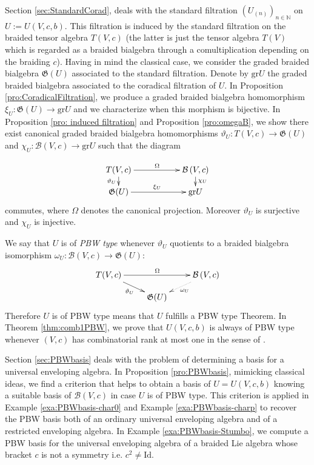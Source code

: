 \documentclass[english]{amsart}
\numberwithin{equation}{section}
\numberwithin{figure}{section}
\theoremstyle{plain}
\theoremstyle{definition}
\theoremstyle{definition}
\theoremstyle{remark}
\theoremstyle{remark}
\theoremstyle{plain}
\theoremstyle{plain}
\theoremstyle{plain}
\begin{document}
Section \ref{sec:StandardCorad}, deals with the standard filtration
$(U_{(n)})_{n\in\mathbb{N}}$ on $U:=U(V,c,b)$. This filtration is
induced by the standard filtration on the braided tensor algebra $T(V,c)$
(the latter is just the tensor algebra $T(V)$ which is regarded as
a braided bialgebra through a comultiplication depending on the braiding
$c$). Having in mind the classical case, we consider the graded braided
bialgebra $\mathfrak{G}(U)$ associated to the standard filtration.
Denote by $\mathrm{gr}U$ the graded braided bialgebra associated
to the coradical filtration of $U$. In Proposition \ref{pro:CoradicalFiltration},
we produce a graded braided bialgebra homomorphism $\xi_{U}:\mathfrak{G}\left(U\right)\rightarrow\mathrm{gr}U$
and we characterize when this morphism is bijective. In Proposition
\ref{pro: induced filtration} and Proposition \ref{pro:omegaB},
we show there exist canonical graded braided bialgebra homomorphisms
$\vartheta_{U}:T\left(V,c\right)\rightarrow\mathfrak{G}\left(U\right)$
and $\chi_{U}:\mathcal{B}\left(V,c\right)\rightarrow\mathrm{gr}U$
such that the diagram

\begin{equation}
\xymatrix@R=10pt{T(V,c)\ar[rr]^{\Omega}\ar[d]_{\vartheta_{U}} &  & \mathcal{B}\left(V,c\right)\ar[d]^{\chi_{U}}\\
\mathfrak{G}(U)\ar[rr]^{\xi_{U}} &  & \mathrm{gr}U}
\label{diag:chi}\end{equation}
commutes, where $\Omega$ denotes the canonical projection. Moreover
$\vartheta_{U}$ is surjective and $\chi_{U}$ is injective. 

We say that $U$ is of \emph{PBW type} whenever $\vartheta_{U}$ quotients
to a braided bialgebra isomorphism $\omega_{U}:\mathcal{B}\left(V,c\right)\rightarrow\mathfrak{G}\left(U\right)$:
\begin{equation}
\xymatrix@R=10pt{T(V,c)\ar[rr]^{\Omega}\ar[rd]_{\vartheta_{U}} &  & \mathcal{B}\left(V,c\right)\ar@{.>}[ld]^{\omega_{U}}\\
 & \mathfrak{G}(U)}
\label{diag:omega}\end{equation}
Therefore $U$ is of PBW type means that $U$ fulfills a PBW type
Theorem. In Theorem \ref{thm:comb1PBW}, we prove that $U\left(V,c,b\right)$
is always of PBW type whenever $\left(V,c\right)$ has combinatorial
rank at most one in the sense of \cite[Definition 5.4]{Kharchenko-SkewPrim}. 

Section \ref{sec:PBWbasis} deals with the problem of determining
a basis for a universal enveloping algebra. In Proposition \ref{pro:PBWbasis},
mimicking classical ideas, we find a criterion that helps to obtain
a basis of $U=U(V,c,b)$ knowing a suitable basis of $\mathcal{B}\left(V,c\right)$
in case $U$ is of PBW type. This criterion is applied in Example
\ref{exa:PBWbasis-char0} and Example \ref{exa:PBWbasis-charp} to
recover the PBW basis both of an ordinary universal enveloping algebra
and of a restricted enveloping algebra. In Example \ref{exa:PBWbasis-Stumbo},
we compute a PBW basis for the universal enveloping algebra of a braided
Lie algebra whose bracket $c$ is not a symmetry i.e. $c^{2}\neq\mathrm{Id}$.
\end{document}
